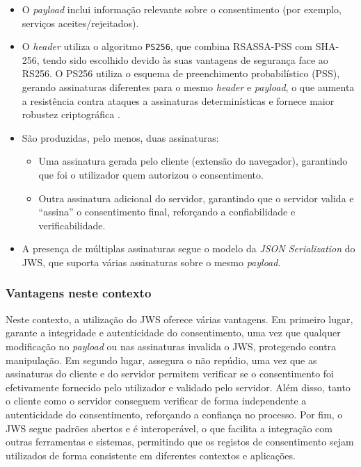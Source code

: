 \begin{itemize}
  \item O \textit{payload} inclui informação relevante sobre o consentimento (por exemplo, serviços aceites/rejeitados).
  \item O \textit{header} utiliza o algoritmo \texttt{PS256}, que combina RSASSA-PSS com SHA-256, tendo sido escolhido devido às suas vantagens de segurança face ao RS256. O PS256 utiliza o esquema de preenchimento probabilístico (PSS), gerando assinaturas diferentes para o mesmo \textit{header} e \textit{payload}, o que aumenta a resistência contra ataques a assinaturas determinísticas e fornece maior robustez criptográfica \citep{ScottBrady2020}.
  \item São produzidas, pelo menos, duas assinaturas:
    \begin{itemize}
      \item Uma assinatura gerada pelo cliente (extensão do navegador), garantindo que foi o utilizador quem autorizou o consentimento.
      \item Outra assinatura adicional do servidor, garantindo que o servidor valida e “assina” o consentimento final, reforçando a confiabilidade e verificabilidade.
    \end{itemize}
  \item A presença de múltiplas assinaturas segue o modelo da \textit{JSON Serialization} do JWS, que suporta várias assinaturas sobre o mesmo \textit{payload}.
\end{itemize}

\subsubsection{Vantagens neste contexto}

Neste contexto, a utilização do JWS oferece várias vantagens. Em primeiro lugar, garante a integridade e autenticidade do consentimento, uma vez que qualquer modificação no \textit{payload} ou nas assinaturas invalida o JWS, protegendo contra manipulação. 
Em segundo lugar, assegura o não repúdio, uma vez que as assinaturas do cliente e do servidor permitem verificar se o consentimento foi efetivamente fornecido pelo utilizador e validado pelo servidor.
Além disso, tanto o cliente como o servidor conseguem verificar de forma independente a autenticidade do consentimento, reforçando a confiança no processo.
Por fim, o JWS segue padrões abertos e é interoperável, o que facilita a integração com outras ferramentas e sistemas, permitindo que os registos de consentimento sejam utilizados de forma consistente em diferentes contextos e aplicações.

